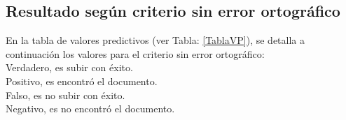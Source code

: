 \subsection{Resultado según criterio sin error ortográfico}
En la tabla de valores predictivos (ver Tabla: \ref{TablaVP}), se detalla a continuación los valores para el criterio sin error ortográfico:\\
Verdadero, es subir con éxito.\\
Positivo, es encontró el documento.\\
Falso, es no subir con éxito.\\
Negativo, es no encontró el documento.\\


